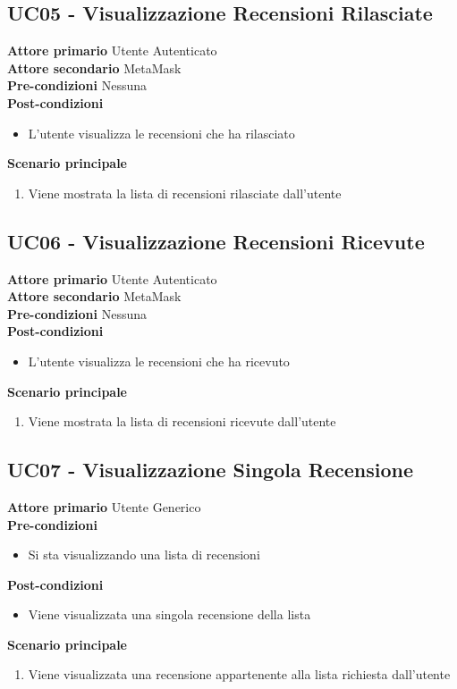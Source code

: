 \subsection{UC05 - Visualizzazione Recensioni Rilasciate}
\label{UC05}
\textbf{Attore primario} Utente Autenticato \\
\textbf{Attore secondario} MetaMask \\
\textbf{Pre-condizioni} Nessuna \\
\textbf{Post-condizioni}
\begin{itemize}
    \item L'utente visualizza le recensioni che ha rilasciato
\end{itemize}
\textbf{Scenario principale}
\begin{enumerate}
    \item Viene mostrata la lista di recensioni rilasciate dall'utente
\end{enumerate}

\subsection{UC06 - Visualizzazione Recensioni Ricevute}
\label{UC06}
\textbf{Attore primario} Utente Autenticato \\
\textbf{Attore secondario} MetaMask \\
\textbf{Pre-condizioni} Nessuna \\
\textbf{Post-condizioni}
\begin{itemize}
    \item L'utente visualizza le recensioni che ha ricevuto
\end{itemize}
\textbf{Scenario principale}
\begin{enumerate}
    \item Viene mostrata la lista di recensioni ricevute dall'utente
\end{enumerate}

\subsection{UC07 - Visualizzazione Singola Recensione}
\label{UC07}
\textbf{Attore primario} Utente Generico \\
\textbf{Pre-condizioni}
\begin{itemize}
    \item Si sta visualizzando una lista di recensioni
\end{itemize}
\textbf{Post-condizioni}
\begin{itemize}
    \item Viene visualizzata una singola recensione della lista
\end{itemize}
\textbf{Scenario principale}
\begin{enumerate}
    \item Viene visualizzata una recensione appartenente alla lista richiesta dall'utente
\end{enumerate}

